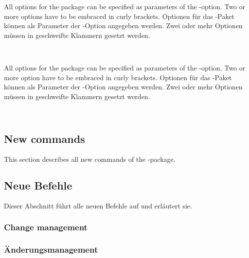 \ifENGLISH
	All options for the  package can be specified as parameters of the -option.
	Two or more options have to be embraced in curly brackets.
\fi
	\ifGERMAN
		Optionen für das -Paket können als Parameter der -Option angegeben werden.
		Zwei oder mehr Optionen müssen in geschweifte Klammern gesetzt werden.
	\fi

\\


\ifENGLISH
	All options for the  package can be specified as parameters of the -option.
	Two or more option have to be embraced in curly brackets.
\fi
	\ifGERMAN
		Optionen für das -Paket können als Parameter der -Option angegeben werden.
		Zwei oder mehr Optionen müssen in geschweifte Klammern gesetzt werden.
	\fi

\\

\ifENGLISH
	\subsection{New commands}

	This section describes all new commands of the -package.
\fi
	\ifGERMAN
		\subsection{Neue Befehle}

		Dieser Abschnitt führt alle neuen Befehle auf und erläutert sie.
	\fi

\ifENGLISH
	\subsubsection{Change management}
\fi
	\ifGERMAN
		\subsubsection{Änderungsmanagement}
	\fi

